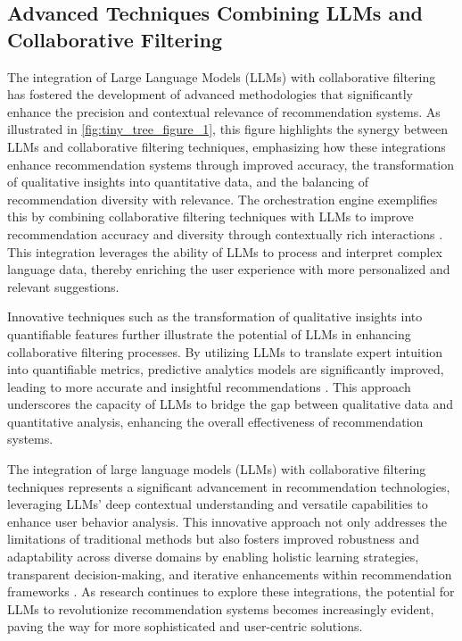 \subsection{Advanced Techniques Combining LLMs and Collaborative Filtering} \label{subsec:Advanced Techniques Combining LLMs and Collaborative Filtering}

The integration of Large Language Models (LLMs) with collaborative filtering has fostered the development of advanced methodologies that significantly enhance the precision and contextual relevance of recommendation systems. As illustrated in \autoref{fig:tiny_tree_figure_1}, this figure highlights the synergy between LLMs and collaborative filtering techniques, emphasizing how these integrations enhance recommendation systems through improved accuracy, the transformation of qualitative insights into quantitative data, and the balancing of recommendation diversity with relevance. The orchestration engine exemplifies this by combining collaborative filtering techniques with LLMs to improve recommendation accuracy and diversity through contextually rich interactions \cite{rasal2024multillmorchestrationenginepersonalized}. This integration leverages the ability of LLMs to process and interpret complex language data, thereby enriching the user experience with more personalized and relevant suggestions.

Innovative techniques such as the transformation of qualitative insights into quantifiable features further illustrate the potential of LLMs in enhancing collaborative filtering processes. By utilizing LLMs to translate expert intuition into quantifiable metrics, predictive analytics models are significantly improved, leading to more accurate and insightful recommendations \cite{jing2024translatingexpertintuitionquantifiable}. This approach underscores the capacity of LLMs to bridge the gap between qualitative data and quantitative analysis, enhancing the overall effectiveness of recommendation systems.

The integration of large language models (LLMs) with collaborative filtering techniques represents a significant advancement in recommendation technologies, leveraging LLMs' deep contextual understanding and versatile capabilities to enhance user behavior analysis. This innovative approach not only addresses the limitations of traditional methods but also fosters improved robustness and adaptability across diverse domains by enabling holistic learning strategies, transparent decision-making, and iterative enhancements within recommendation frameworks \cite{vats2024exploring,wang2024llm,luo2024integrating,carraro2024enhancingrecommendationdiversityreranking}. As research continues to explore these integrations, the potential for LLMs to revolutionize recommendation systems becomes increasingly evident, paving the way for more sophisticated and user-centric solutions.


